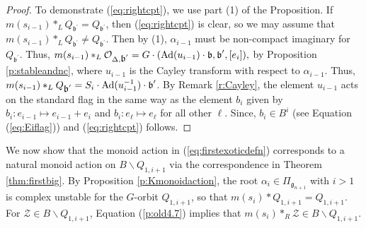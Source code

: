 \documentclass[12pt]{amsart}
\numberwithin{equation}{section}
\newcommand{\cZ}{{\mathcal Z}}
\newcommand{\fg}{\mbox{${\mathfrak g}$}}
\newcommand{\fb}{\mbox{${\mathfrak b}$}}
\newcommand{\Ad}{{\rm Ad}}
\begin{document}
\begin{proof}
To demonstrate (\ref{eq:rightcpt}), we use part (1) of the Proposition.  
 If $m(s_{i-1})*_{L}Q_{\fb^{\prime}}=Q_{\fb^{\prime}}$, then (\ref{eq:rightcpt}) is clear, so we may assume that $m(s_{i-1})*_{L}Q_{\fb^{\prime}}\neq Q_{\fb^{\prime}}$.  Then by (1), $\alpha_{i-1}$ must be non-compact imaginary for 
$Q_{\fb^{\prime}}$.  Thus, $m(s_{i-1})*_{L}\mathcal{O}_{\Delta,\fb^{\prime}}=G\cdot (\Ad(u_{i-1})\cdot \fb,\fb^{\prime}, [e_i]),$ by Proposition \ref{p:stableandnc}, where $u_{i-1}$ is the Cayley transform with respect to $\alpha_{i-1}$.  Thus, $m(s_{i-1})*_{L}Q_{\fb^{\prime}}=S_{i}\cdot \Ad(u_{i-1}^{-1})\cdot \fb^{\prime}$.  By Remark \ref{r:Cayley}, the element $u_{i-1}$ acts on the standard flag in the same way as the element $b_{i}$ given by $b_{i}:e_{i-1}\mapsto e_{i-1}+e_{i}$ and 
$b_{i}: e_{\ell}\mapsto e_{\ell}$ for all other $\ell$.  Since, $b_{i}\in B^{i}$ (see Equation (\ref{eq:Eiflag})) and (\ref{eq:rightcpt}) follows.
\end{proof}

We now show that the monoid action in (\ref{eq:firstexoticdefn}) corresponds to a natural monoid action on $B\backslash Q_{1,i+1}$ via the correspondence in Theorem \ref{thm:firstbig}.  By Proposition \ref{p:Kmonoidaction}, the root $\alpha_{i}\in\Pi_{\fg_{n+1}}$ with $i>1$ is complex unstable for the $G$-orbit $Q_{1,i+1}$, so that  $m(s_{i})*Q_{1,i+1}=Q_{1,i+1}$.  For $\cZ\in B\backslash Q_{1,i+1}$, Equation (\ref{p:old4.7}) implies that $m(s_{i})*_{R}\cZ\in B\backslash Q_{1,i+1}$.  
 
\end{document}
